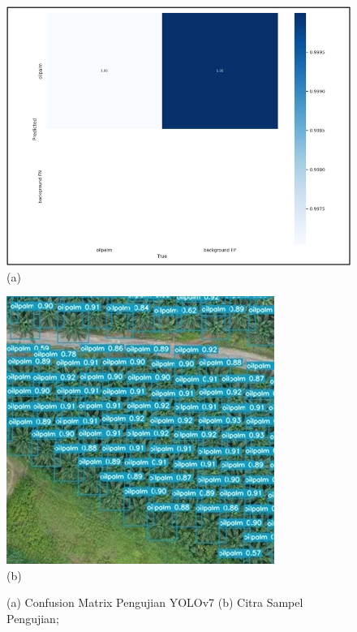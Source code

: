 \begin{figure}[H]
	\vspace{-0.1cm}
	\begin{center}
		\includegraphics[width=0.5\columnwidth]{bab4/Gambar/Picture33.1.png}\\
		(a)
	\end{center}
	\begin{center}
		\includegraphics[width=0.5\columnwidth]{bab4/Gambar/Picture33.2.jpg}\\
		(b)
	\end{center}
	\vspace{-0.2cm}
	\captionsetup{justification=centering}
	\caption{(a) Confusion Matrix Pengujian YOLOv7 (b) Citra Sampel Pengujian;}\label{img:Confusion-Matrix-Pengujian-YOLOv7-Citra-Sampel}
\end{figure}

